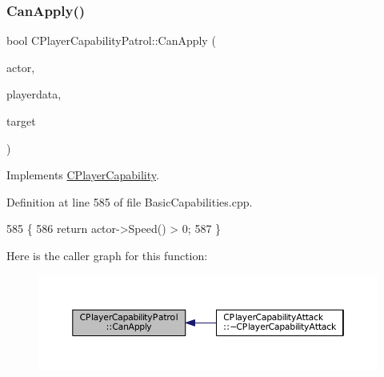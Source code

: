 \hypertarget{classCPlayerCapabilityPatrol_a63c099d931e1e57db01120db7b1fdbe4}{}\label{classCPlayerCapabilityPatrol_a63c099d931e1e57db01120db7b1fdbe4} 
\subsubsection{\texorpdfstring{Can\+Apply()}{CanApply()}}
{\footnotesize\ttfamily bool C\+Player\+Capability\+Patrol\+::\+Can\+Apply (\begin{DoxyParamCaption}\item[{std\+::shared\+\_\+ptr$<$ \hyperlink{classCPlayerAsset}{C\+Player\+Asset} $>$}]{actor,  }\item[{std\+::shared\+\_\+ptr$<$ \hyperlink{classCPlayerData}{C\+Player\+Data} $>$}]{playerdata,  }\item[{std\+::shared\+\_\+ptr$<$ \hyperlink{classCPlayerAsset}{C\+Player\+Asset} $>$}]{target }\end{DoxyParamCaption})\hspace{0.3cm}{\ttfamily [virtual]}}



Implements \hyperlink{classCPlayerCapability_ae96263e0950f496492f8baeb877b9554}{C\+Player\+Capability}.



Definition at line 585 of file Basic\+Capabilities.\+cpp.


\begin{DoxyCode}
585                                                                                                            
                                                   \{
586     \textcolor{keywordflow}{return} actor->Speed() > 0;
587 \}
\end{DoxyCode}
Here is the caller graph for this function\+:
\nopagebreak
\begin{figure}[H]
\begin{center}
\leavevmode
\includegraphics[width=350pt]{classCPlayerCapabilityPatrol_a63c099d931e1e57db01120db7b1fdbe4_icgraph}
\end{center}
\end{figure}
\hypertarget{classCPlayerCapabilityPatrol_a48e60ecd544759f3aad66afeb4a6e0a9}{}\label{classCPlayerCapabilityPatrol_a48e60ecd544759f3aad66afeb4a6e0a9} 
